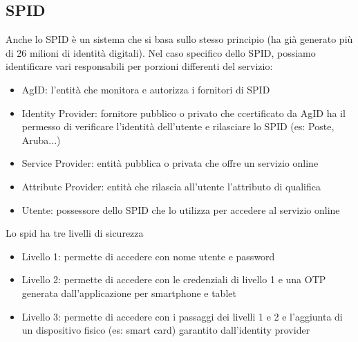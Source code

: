 \subsection{SPID}
Anche lo \acrfull{SPID} è un sistema che si basa sullo stesso principio (ha già generato più di 26 milioni di identità digitali).
Nel caso specifico dello \acrshort{SPID}, possiamo identificare vari responsabili per porzioni differenti del servizio:
\begin{itemize}[noitemsep]
    \item \acrfull{AgID}: l'entità che monitora e autorizza i fornitori di \acrshort{SPID}
    \item Identity Provider: fornitore pubblico o privato che ccertificato da \acrshort{AgID} ha il permesso di verificare l'identità dell'utente e rilasciare lo \acrshort{SPID} (es: Poste, Aruba...)
    \item Service Provider: entità pubblica o privata che offre un servizio online
    \item Attribute Provider: entità che rilascia all'utente l'attributo di qualifica
    \item Utente: possessore dello \acrshort{SPID} che lo utilizza per accedere al servizio online
\end{itemize}
Lo spid ha tre livelli di sicurezza
\begin{itemize}[noitemsep]
    \item Livello 1: permette di accedere con nome utente e password
    \item Livello 2: permette di accedere con le credenziali di livello 1 e una \acrshort{OTP} generata dall'applicazione per smartphone e tablet
    \item Livello 3: permette di accedere con i passaggi dei livelli 1 e 2 e l'aggiunta di un dispositivo fisico (es: smart card) garantito dall'identity provider
\end{itemize}

